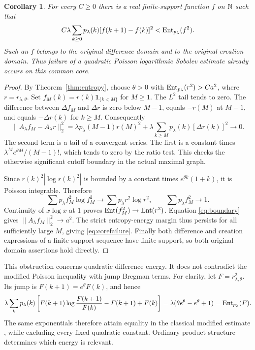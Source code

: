 \documentclass[11pt]{article}
\newtheorem{corollary}[theorem]{Corollary}
\begin{document}
\begin{corollary}\label{cor:core}
For every $C\geq0$ there is a real finite-support function $f$ on
$\mathbb N$ such that
\begin{equation}\label{eq:corefailure}
 C\lambda\sum_{k\geq0}p_\lambda(k)[f(k+1)-f(k)]^2
 <\operatorname{Ent}_{p_\lambda}(f^2).
\end{equation}
Such an $f$ belongs to the original difference domain and to the
original creation domain. Thus failure of a quadratic Poisson
logarithmic Sobolev estimate already occurs on this common core.
\end{corollary}
\begin{proof}
By Theorem~\ref{thm:entropy}, choose $\theta>0$ with
$\operatorname{Ent}_{p_\lambda}(r^2)>C a^2$, where $r=r_{\lambda,\theta}$.
Set $f_M(k)=r(k)\mathbf1_{\{k<M\}}$ for $M\geq1$.
The $L^2$ tail tends to zero. The difference between
$\Delta f_M$ and $\Delta r$ is zero below $M-1$, equals $-r(M)$
at $M-1$, and equals $-\Delta r(k)$ for $k\geq M$.
Consequently
\begin{equation}\label{eq:boundary}
 \|A_\lambda f_M-A_\lambda r\|_2^2
 =\lambda p_\lambda(M-1)r(M)^2
  +\lambda\sum_{k\geq M}p_\lambda(k)[\Delta r(k)]^2
 \longrightarrow0.
\end{equation}
The second term is a tail of a convergent series. The first is a
constant times $\lambda^M e^{\theta M}/(M-1)!$, which tends to zero
by the ratio test. This checks the otherwise significant cutoff
boundary in the actual maximal graph.

Since $r(k)^2|\log r(k)^2|$ is bounded by a constant times
$e^{\theta k}(1+k)$, it is Poisson integrable. Therefore
\[
 \sum p_\lambda f_M^2\log f_M^2\longrightarrow
 \sum p_\lambda r^2\log r^2,
 \qquad \sum p_\lambda f_M^2\longrightarrow1.
\]
Continuity of $x\log x$ at $1$ proves
$\operatorname{Ent}(f_M^2)\to\operatorname{Ent}(r^2)$. Equation \eqref{eq:boundary} gives
$\|A_\lambda f_M\|_2^2\to a^2$. The strict entropy-energy margin
thus persists for all sufficiently large $M$, giving
\eqref{eq:corefailure}. Finally both difference and creation expressions
of a finite-support sequence have finite support, so both original
domain assertions hold directly.
\end{proof}

This obstruction concerns quadratic difference energy. It does not
contradict the modified Poisson inequality with jump Bregman terms.
For clarity, let $F=r_{\lambda,\theta}^2$. Its jump is
$F(k+1)=e^\theta F(k)$, and hence
\[
 \lambda\sum_k p_\lambda(k)
 \left[F(k+1)\log\frac{F(k+1)}{F(k)}-F(k+1)+F(k)\right]
 =\lambda(\theta e^\theta-e^\theta+1)=\operatorname{Ent}_{p_\lambda}(F).
\]
The same exponentials therefore attain equality in the classical
modified estimate \cite{ALRS}, while excluding every fixed quadratic
constant. Ordinary product structure determines which energy is relevant.
\end{document}
